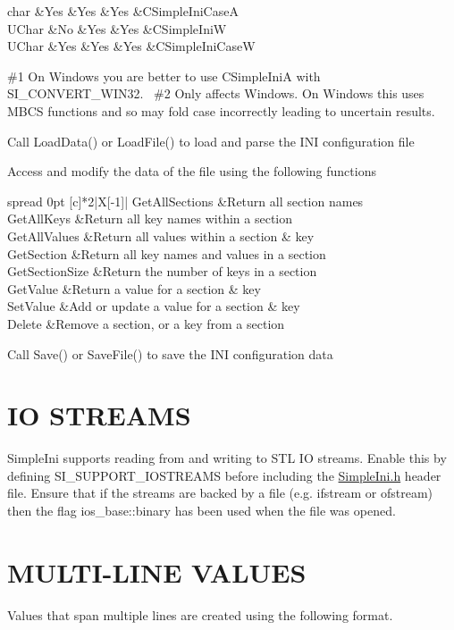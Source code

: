 \begin{DoxyEnumerate}
\begin{longtabu}
char &Yes &Yes &Yes &C\+Simple\+Ini\+CaseA \\
U\+Char &No &Yes &Yes &C\+Simple\+IniW \\
U\+Char &Yes &Yes &Yes &C\+Simple\+Ini\+CaseW \\
\end{longtabu}
\#1 On Windows you are better to use C\+Simple\+IniA with S\+I\+\_\+\+C\+O\+N\+V\+E\+R\+T\+\_\+\+W\+I\+N32.~\newline
 \#2 Only affects Windows. On Windows this uses M\+B\+CS functions and so may fold case incorrectly leading to uncertain results.
\item Call Load\+Data() or Load\+File() to load and parse the I\+NI configuration file
\item Access and modify the data of the file using the following functions \tabulinesep=1mm
\begin{longtabu} spread 0pt [c]{*2{|X[-1]}|}
\hline
Get\+All\+Sections &Return all section names \\
Get\+All\+Keys &Return all key names within a section \\
Get\+All\+Values &Return all values within a section \& key \\
Get\+Section &Return all key names and values in a section \\
Get\+Section\+Size &Return the number of keys in a section \\
Get\+Value &Return a value for a section \& key \\
Set\+Value &Add or update a value for a section \& key \\
Delete &Remove a section, or a key from a section \\
\end{longtabu}

\item Call Save() or Save\+File() to save the I\+NI configuration data
\end{DoxyEnumerate}\hypertarget{index_iostreams}{}\section{I\+O S\+T\+R\+E\+A\+MS}\label{index_iostreams}
Simple\+Ini supports reading from and writing to S\+TL IO streams. Enable this by defining S\+I\+\_\+\+S\+U\+P\+P\+O\+R\+T\+\_\+\+I\+O\+S\+T\+R\+E\+A\+MS before including the \hyperlink{SimpleIni_8h_source}{Simple\+Ini.\+h} header file. Ensure that if the streams are backed by a file (e.\+g. ifstream or ofstream) then the flag ios\+\_\+base\+::binary has been used when the file was opened.\hypertarget{index_multiline}{}\section{M\+U\+L\+T\+I-\/\+L\+I\+N\+E V\+A\+L\+U\+ES}\label{index_multiline}
Values that span multiple lines are created using the following format.


